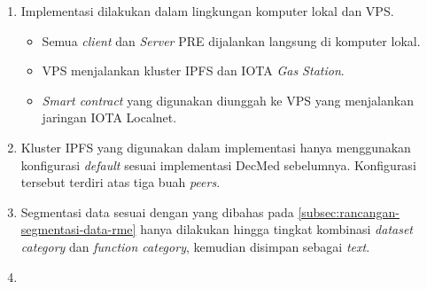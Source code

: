 \begin{enumerate}
	\item Implementasi dilakukan dalam lingkungan komputer lokal dan VPS.
	      \begin{itemize}
		      \item Semua \textit{client} dan \textit{Server} PRE dijalankan langsung di komputer lokal.
		      \item VPS menjalankan kluster IPFS dan IOTA \textit{Gas Station}.
		      \item \textit{Smart contract} yang digunakan diunggah ke VPS yang menjalankan jaringan IOTA Localnet.
	      \end{itemize}
	\item Kluster IPFS yang digunakan dalam implementasi hanya menggunakan konfigurasi \textit{default} sesuai implementasi DecMed sebelumnya. Konfigurasi tersebut terdiri atas tiga buah \textit{peers}.
	\item Segmentasi data sesuai dengan yang dibahas pada \ref{subsec:rancangan-segmentasi-data-rme} hanya dilakukan hingga tingkat kombinasi \textit{dataset category} dan \textit{function category}, kemudian disimpan sebagai \textit{text}.
	\item
\end{enumerate}